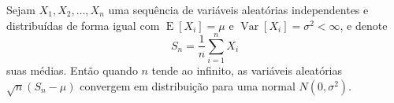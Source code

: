 \documentclass{article}
\begin{document}
Sejam $X_1, X_2, \ldots, X_n$ uma sequência de variáveis aleatórias
independentes e distribuídas de forma igual com $\operatorname{E}[X_i] = \mu$
e $\operatorname{Var}[X_i] = \sigma^2 < \infty$, e denote
\begin{equation*}
S_n = \frac{1}{n}\sum_{i=1}^{n} X_i
\end{equation*}
suas médias. Então quando $n$ tende ao infinito, as variáveis aleatórias  
$\sqrt{n}(S_n - \mu)$ convergem em distribuição para uma normal $N(0,
\sigma^2)$.

\end{document}
